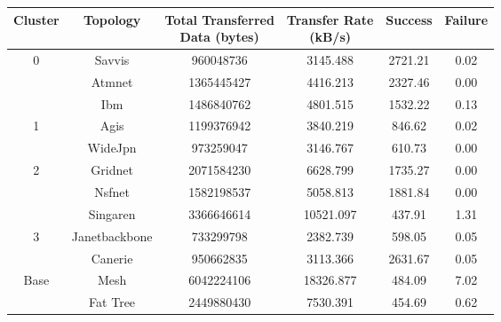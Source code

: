 \begin{tabular}{cccccc}
\toprule
Cluster & Topology & \thead{Total Transferred\\Data (bytes)} & \thead{Transfer Rate\\(kB/s)} & Success & Failure \\
\midrule
\multirow{3}{*}{0}& Savvis & \num{960048736} & 3145.488 & 2721.21 & 0.02 \\
& Atmnet & \num{1365445427} & 4416.213 & 2327.46 & 0.00 \\
& Ibm & \num{1486840762} & 4801.515 & 1532.22 & 0.13 \\ \hline
\multirow{2}{*}{1}& Agis & \num{1199376942} & 3840.219 & 846.62 & 0.02 \\
& WideJpn & \num{973259047} & 3146.767 & 610.73 & 0.00 \\ \hline
\multirow{3}{*}{2}& Gridnet & \num{2071584230} & 6628.799 & 1735.27 & 0.00 \\
& Nsfnet & \num{1582198537} & 5058.813 & 1881.84 & 0.00 \\
& Singaren & \num{3366646614} & 10521.097 & 437.91 & 1.31 \\ \hline
\multirow{2}{*}{3}& Janetbackbone & \num{733299798} & 2382.739 & 598.05 & 0.05 \\
& Canerie & \num{950662835} & 3113.366 & 2631.67 & 0.05 \\ \hline
\multirow{2}{*}{Base}& Mesh & \num{6042224106} & 18326.877 & 484.09 & 7.02 \\
& Fat Tree & \num{2449880430} & 7530.391 & 454.69 & 0.62 \\
\bottomrule
\end{tabular}
